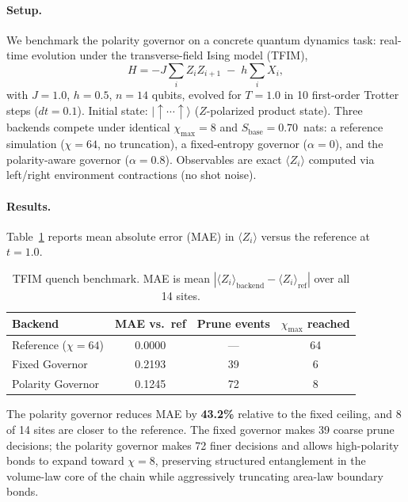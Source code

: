 \documentclass{article}
\begin{document}
\paragraph{Setup.}
We benchmark the polarity governor on a concrete quantum dynamics task: real-time evolution under the transverse-field Ising model (TFIM),
\begin{equation}
  H = -J \sum_{i} Z_i Z_{i+1} \;-\; h \sum_{i} X_i,
\label{eq:tfim}
\end{equation}
with $J=1.0$, $h=0.5$, $n=14$ qubits, evolved for $T=1.0$ in 10 first-order Trotter steps ($dt=0.1$).
Initial state: $|\!\uparrow\cdots\uparrow\rangle$ ($Z$-polarized product state).
Three backends compete under identical $\chi_{\max}=8$ and $S_{\text{base}}=0.70$~nats: a reference simulation ($\chi=64$, no truncation), a fixed-entropy governor ($\alpha=0$), and the polarity-aware governor ($\alpha=0.8$).
Observables are exact $\langle Z_i\rangle$ computed via left/right environment contractions (no shot noise).

\paragraph{Results.}
Table~\ref{tab:quench} reports mean absolute error (MAE) in $\langle Z_i\rangle$ versus the reference at $t=1.0$.

\begin{table}[h]
  \caption{TFIM quench benchmark. MAE is mean $|\langle Z_i\rangle_{\text{backend}} - \langle Z_i\rangle_{\text{ref}}|$ over all 14 sites.}
  \label{tab:quench}
  \centering
  \small
  \begin{tabular}{lccc}
    \toprule
    Backend & MAE vs.\ ref & Prune events & $\chi_{\max}$ reached \\
    \midrule
    Reference ($\chi=64$) & 0.0000 & — & 64 \\
    Fixed Governor        & 0.2193 & 39 & 6  \\
    Polarity Governor     & 0.1245 & 72 & 8  \\
    \bottomrule
  \end{tabular}
\end{table}

The polarity governor reduces MAE by \textbf{43.2\%} relative to the fixed ceiling, and 8 of 14 sites are closer to the reference.
The fixed governor makes 39 coarse prune decisions; the polarity governor makes 72 finer decisions and allows high-polarity bonds to expand toward $\chi=8$, preserving structured entanglement in the volume-law core of the chain while aggressively truncating area-law boundary bonds.
\end{document}
